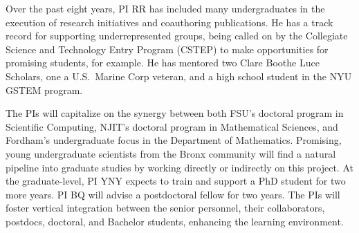 Over the past eight years, PI RR has included many undergraduates in the
execution of research initiatives and coauthoring publications. He has a
track record for supporting underrepresented groups, being called on by
the Collegiate Science and Technology Entry Program (CSTEP) to make
opportunities for promising students, for example. He has mentored two
Clare Boothe Luce Scholars, one a U.S.~Marine Corp veteran, and a high
school student in the NYU GSTEM program. 

The PIs will capitalize on the synergy between both FSU's doctoral
program in Scientific Computing, NJIT's doctoral program in Mathematical
Sciences, and Fordham's undergraduate focus in the Department of
Mathematics. Promising, young undergraduate scientists from the Bronx
community will find a natural pipeline into graduate studies by working
directly or indirectly on this project. At the graduate-level, PI YNY
expects to train and support a PhD student for two more years. PI BQ
will advise a postdoctoral fellow for two years. The PIs will foster
vertical integration between the senior personnel, their collaborators,
postdocs, doctoral, and Bachelor students, enhancing the learning
environment.

%
%

